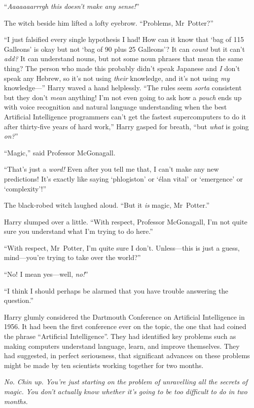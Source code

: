 “\emph{Aaaaaaarrrgh this doesn’t make any sense!}”

The witch beside him lifted a lofty eyebrow. “Problems, Mr~Potter?”

“I just falsified every single hypothesis I had! How can it know that ‘bag of 115 Galleons’ is okay but not ‘bag of 90 plus 25 Galleons’? It can \emph{count} but it can’t \emph{add?} It can understand nouns, but not some noun phrases that mean the same thing? The person who made this probably didn’t speak Japanese and \emph{I} don’t speak any Hebrew, so it’s not using \emph{their} knowledge, and it’s not using \emph{my} knowledge—” Harry waved a hand helplessly. “The rules seem \emph{sorta} consistent but they don’t \emph{mean} anything! I’m not even going to ask how a \emph{pouch} ends up with voice recognition and natural language understanding when the best Artificial Intelligence programmers can’t get the fastest supercomputers to do it after thirty-five years of hard work,” Harry gasped for breath, “but \emph{what} is going \emph{on?}”

“Magic,” said Professor McGonagall.

“That’s just a \emph{word!} Even after you tell me that, I can’t make any new predictions! It’s exactly like saying ‘phlogiston’ or ‘élan vital’ or ‘emergence’ or ‘complexity’!”

The black-robed witch laughed aloud. “But it \emph{is} magic, Mr~Potter.”

Harry slumped over a little. “With respect, Professor McGonagall, I’m not quite sure you understand what I’m trying to do here.”

“With respect, Mr~Potter, I’m quite sure I don’t. Unless—this is just a guess, mind—you’re trying to take over the world?”

“No! I mean yes—well, \emph{no!}”

“I think I should perhaps be alarmed that you have trouble answering the question.”

Harry glumly considered the Dartmouth Conference on Artificial Intelligence in 1956. It had been the first conference ever on the topic, the one that had coined the phrase “Artificial Intelligence”. They had identified key problems such as making computers understand language, learn, and improve themselves. They had suggested, in perfect seriousness, that significant advances on these problems might be made by ten scientists working together for two months.

\emph{No. Chin up. You’re just \emph{starting} on the problem of unravelling all the secrets of magic. You don’t actually \emph{know} whether it’s going to be too difficult to do in two months.}

